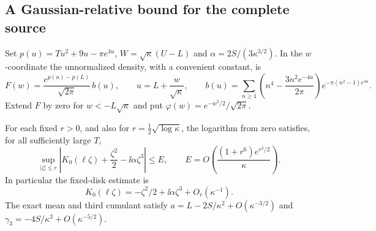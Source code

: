 \subsection{A Gaussian-relative bound for the complete source}

Set \(p(u)=Tu^2+9u-\pi e^{4u}\), \(W=\sqrt{\kappa}(U-L)\) and
\(\alpha=2S/(3\kappa^{3/2})\). In the \(w\)-coordinate the unnormalized
density, with a convenient constant, is
\[
 F(w)=\frac{e^{p(u)-p(L)}}{\sqrt{2\pi}}\,b(u),\qquad
 u=L+\frac{w}{\sqrt\kappa},\qquad
 b(u)=\sum_{n\ge1}\left(n^4-\frac{3n^2e^{-4u}}{2\pi}\right)
                         e^{-\pi(n^2-1)e^{4u}} .
\]
Extend \(F\) by zero for \(w<-L\sqrt\kappa\) and put
\(\varphi(w)=e^{-w^2/2}/\sqrt{2\pi}\).

\begin{lemma}\label{lem:saddle}
For each fixed \(r>0\), and also for \(r=\tfrac12\sqrt{\log\kappa}\), the
logarithm from zero satisfies, for all sufficiently large \(T\),
\begin{equation}
 \sup_{|\zeta|\le r}
 \left|K_0(\ell\zeta)+\frac{\zeta^2}{2}-\ii\alpha\zeta^3\right|
 \le E,\qquad
 E=O\!\left(\frac{(1+r^6)e^{r^2/2}}{\kappa}\right).
 \label{eq:window-log}
\end{equation}
In particular the fixed-disk estimate is
\begin{equation}
 K_0(\ell\zeta)=-\zeta^2/2+\ii\alpha\zeta^3+O_r(\kappa^{-1}).
 \label{eq:complex-saddle}
\end{equation}
The exact mean and third cumulant satisfy
\(a=L-2S/\kappa^2+O(\kappa^{-3/2})\) and
\(\gamma_3=-4S/\kappa^3+O(\kappa^{-5/2})\).
\end{lemma}
